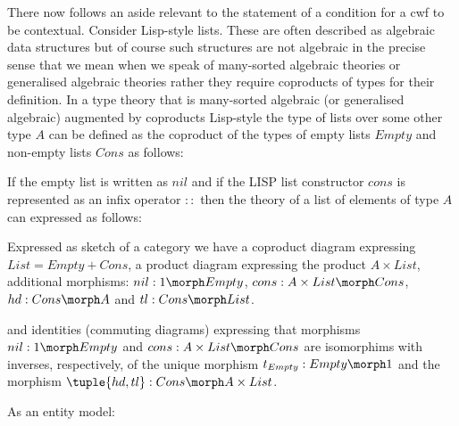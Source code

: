 \note 
There now follows an aside relevant to the statement of a  condition for a cwf to be contextual. Consider  Lisp-style lists. These  are often described as algebraic data structures but of course such structures are not algebraic in the precise sense that we mean when we speak of many-sorted algebraic theories or generalised algebraic theories rather they require coproducts of types for their definition. In a type theory that is many-sorted algebraic (or generalised algebraic) augmented by coproducts Lisp-style the type of lists over some other type $A$ can be defined as the coproduct of the types of empty lists $Empty$ and non-empty lists $Cons$
 as follows:\\



\begin{minipage}{\textwidth}
\begin{notebox}

If the empty list is written as $nil$ and if the LISP list constructor $cons$ is represented
as an infix operator $::$ then the theory of a list of elements of type $A$ can expressed as follows: 
\begin{gatrules}
\gatintros
{}   
\gataxioms
{}                            
\end{gatrules}
Expressed as sketch of a category we have a coproduct diagram
expressing $List = Empty + Cons$,
a product diagram expressing the product $A \times List$,
additional morphisms:
$nil: 1 \morph Empty$,
$cons : A \times List \morph Cons$,
$hd: Cons \morph A$ and
$tl: Cons \morph List$.

and identities (commuting diagrams) expressing that
morphisms $nil: 1 \morph Empty$ and $cons : A \times List \morph Cons$ are isomorphims 
with inverses, respectively, of the unique morphism $t_{Empty}: Empty \morph 1$
and the morphism $\tuple{hd,tl}:Cons \morph A \times List$. 

As an entity model:
\begin{center}
 
\end{center}
\end{notebox}
\end{minipage}

